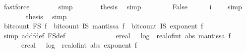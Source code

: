\begin{isabellebody}
\ fastforce\isanewline
\ \ \ \ \ \ \isamarkupfalse%
\ simp{\isacharplus}{\kern0pt}\isanewline
\ \ \ \ \isamarkupfalse%
\ \isamarkupfalse%
\ {\isacharquery}{\kern0pt}thesis\ \isamarkupfalse%
\ simp\isanewline
\ \ \isamarkupfalse%
\isanewline
\ \ \ \ \isamarkupfalse%
\ False\isanewline
\ \ \ \ \isamarkupfalse%
\ {\isachardoublequoteopen}i\ {\isacharequal}{\kern0pt}\ {}{\isachardoublequoteclose}\ \isamarkupfalse%
\ simp\isanewline
\ \ \ \ \isamarkupfalse%
\ \isamarkupfalse%
\ {\isacharquery}{\kern0pt}thesis\ \isamarkupfalse%
\ simp\isanewline
\ \ \isamarkupfalse%
\ \isanewline
\isanewline
\ \ \isamarkupfalse%
\ {\isachardoublequoteopen}bit{\isacharunderscore}{\kern0pt}count\ {\isacharparenleft}{\kern0pt}F\isactrlsub S\ f{\isacharparenright}{\kern0pt}\ {\isacharequal}{\kern0pt}\ bit{\isacharunderscore}{\kern0pt}count\ {\isacharparenleft}{\kern0pt}I\isactrlsub S\ {\isacharparenleft}{\kern0pt}mantissa\ f{\isacharparenright}{\kern0pt}{\isacharparenright}{\kern0pt}\ {\isacharplus}{\kern0pt}\ bit{\isacharunderscore}{\kern0pt}count\ {\isacharparenleft}{\kern0pt}I\isactrlsub S\ {\isacharparenleft}{\kern0pt}exponent\ f{\isacharparenright}{\kern0pt}{\isacharparenright}{\kern0pt}{\isachardoublequoteclose}\isanewline
\ \ \ \ \isamarkupfalse%
\ {\isacharparenleft}{\kern0pt}simp\ add{\isacharcolon}{\kern0pt}f{\isacharunderscore}{\kern0pt}def\ F\isactrlsub S{\isacharunderscore}{\kern0pt}def{\isacharparenright}{\kern0pt}\isanewline
\ \ \isamarkupfalse%
\ \isamarkupfalse%
\ {\isachardoublequoteopen}{\isachardot}{\kern0pt}{\isachardot}{\kern0pt}{\isachardot}{\kern0pt}\ {\isasymle}\ \isanewline
\ \ \ \ \ \ ereal\ {\isacharparenleft}{\kern0pt}{}\ {\isacharasterisk}{\kern0pt}\ {\isacharparenleft}{\kern0pt}log\ {}\ {\isacharparenleft}{\kern0pt}real{\isacharunderscore}{\kern0pt}of{\isacharunderscore}{\kern0pt}int\ {\isacharparenleft}{\kern0pt}abs\ {\isacharparenleft}{\kern0pt}mantissa\ f{\isacharparenright}{\kern0pt}\ {\isacharplus}{\kern0pt}\ {}{\isacharparenright}{\kern0pt}{\isacharparenright}{\kern0pt}{\isacharparenright}{\kern0pt}{\isacharplus}{\kern0pt}\ {}{\isacharparenright}{\kern0pt}\ {\isacharplus}{\kern0pt}\ \isanewline
\ \ \ \ \ \ ereal\ {\isacharparenleft}{\kern0pt}{}\ {\isacharasterisk}{\kern0pt}\ {\isacharparenleft}{\kern0pt}log\ {}\ {\isacharparenleft}{\kern0pt}real{\isacharunderscore}{\kern0pt}of{\isacharunderscore}{\kern0pt}int\ {\isacharparenleft}{\kern0pt}abs\ {\isacharparenleft}{\kern0pt}exponent\ f{\isacharparenright}{\kern0pt}\ {\isacharplus}{\kern0pt}\ {}{\isacharparenright}{\kern0pt}{\isacharparenright}{\kern0pt}{\isacharparenright}{\kern0pt}{\isacharplus}{\kern0pt}\ {}{\isacharparenright}{\kern0pt}{\isachardoublequoteclose}\isanewline

\end{isabellebody}
